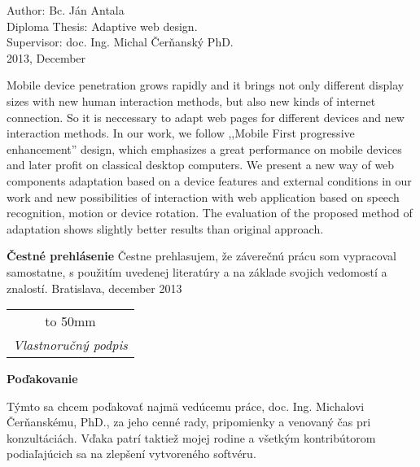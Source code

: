 Author: Bc. Ján Antala\\
Diploma Thesis: Adaptive web design. \\
Supervisor: doc. Ing. Michal Čerňanský PhD. \\
2013, December
\newline

Mobile device penetration grows rapidly and it brings not only different display sizes with new human interaction methods, but also new kinds of internet connection. So it is neccessary to adapt web pages for different devices and new interaction methods.
In our work, we follow ,,Mobile First progressive enhancement'' design, which emphasizes a great performance on mobile devices and later profit on classical desktop computers. We present a new way of web components adaptation based on a device features and external conditions in our work and new possibilities of interaction with web application based on speech recognition, motion or device rotation.
The evaluation of the proposed method of adaptation shows slightly better results than original approach.


\pagebreak
\thispagestyle{empty}
\bigskip\vfil
 \noindent\textbf{Čestné prehlásenie}
\newline\newline
Čestne prehlasujem, že záverečnú prácu som vypracoval samostatne, s použitím uvedenej
literatúry a na základe svojich vedomostí a znalostí.
\newline\newline
\noindent Bratislava, december 2013 \hfil
\begin{tabular}[t]{c}
\hbox to 50mm {\dotfill} \\ \textit{\small Vlastnoručný podpis}
\end{tabular}\qquad\linebreak

\pagebreak
\thispagestyle{empty}
\bigskip\vfil
 \noindent\textbf{Poďakovanie}
\bigskip

Týmto sa chcem poďakovať najmä vedúcemu práce, doc. Ing. Michalovi Čerňanskému, PhD.,
za jeho cenné rady, pripomienky a venovaný čas pri konzultáciách. Vďaka patrí taktiež mojej rodine a všetkým kontribútorom podiaľajúcich sa na zlepšení vytvoreného softvéru.
\pagebreak

\newpage
\setcounter{page}{1}
\thispagestyle{empty}
\setcounter{tocdepth}{3}
\tableofcontents %
\newpage 
\thispagestyle{empty}
\listoftables
\newpage
\thispagestyle{empty}
\listoffigures 
\newpage